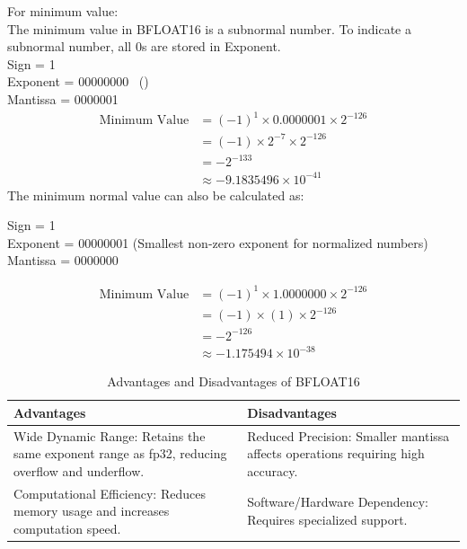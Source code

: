 \documentclass{ioereport}
\begin{document}
\begin{enumerate}[label=\textbf{\roman*.}]
    For minimum value:\\
    The minimum value in BFLOAT16 is a subnormal number. To indicate a subnormal number, all 0s are stored in Exponent. \\
    Sign = 1 \\
    Exponent = 00000000 \ () \\
    Mantissa = 0000001
    \[
        \begin{aligned}
            \text{Minimum Value} &= (-1)^{1} \times 0.0000001 \times 2^{-126} \\
            & = (-1) \times 2^{-7} \times 2^{-126} \\
            & = -2^{-133} \\
            & \approx -9.1835496 \times 10^{-41}
        \end{aligned}
    \]
    The minimum normal value can also be calculated as:

        Sign = 1 \\
        Exponent = 00000001 (Smallest non-zero exponent for normalized numbers) \\
        Mantissa = 0000000

    \[
        \begin{aligned}
            \text{Minimum Value} &= (-1)^{1} \times 1.0000000 \times 2^{-126} \\
            & = (-1) \times (1) \times 2^{-126} \\
            & =  -2^{-126} \\
            & \approx -1.175494 \times 10^{-38}
        \end{aligned}
    \]

    \begin{table}[H]
        \centering
        \caption{Advantages and Disadvantages of BFLOAT16}
        \label{tab:bfloat16}
            \begin{tabular}{|p{6cm}|p{6cm}|}
            \hline
            \textbf{Advantages} & \textbf{Disadvantages} \\
            \hline
            Wide Dynamic Range: Retains the same exponent range as fp32, reducing overflow and underflow. & Reduced Precision: Smaller mantissa affects operations requiring high accuracy. \\
            \hline
            Computational Efficiency: Reduces memory usage and increases computation speed. & 
            Software/Hardware Dependency: Requires specialized support.\\
            \hline
            \end{tabular}
    \end{table}


\end{enumerate}
\end{document}
